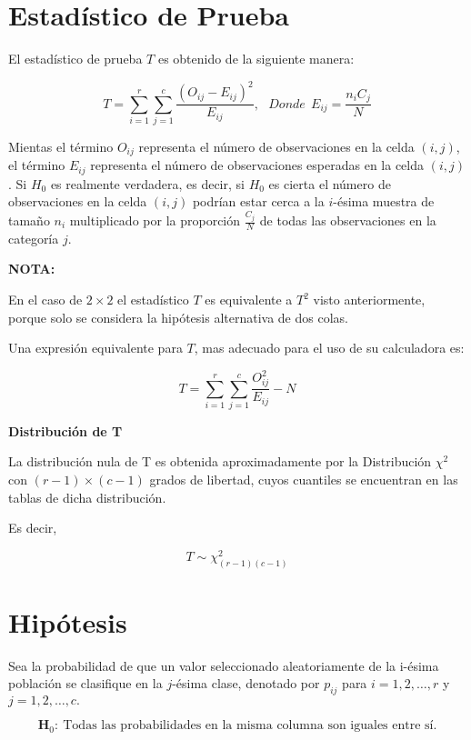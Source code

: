 \documentclass[
  a4paper,
  oneside,
  openany]{book}
\begin{document}
\hypertarget{estaduxedstico-de-prueba-11}{%
\section{Estadístico de Prueba}\label{estaduxedstico-de-prueba-11}}

El estadístico de prueba \(T\) es obtenido de la siguiente manera:

\[T=\sum_{i=1}^{r}\sum_{j=1}^{c}\frac{(O_{ij}-E_{ij})^2}{E_{ij}}, \ \ \ Donde\ \ E_{ij}=\frac{n_{i}C_{j}}{N}\]

Mientas el término \(O_{ij}\) representa el número de observaciones en la celda \((i,j)\), el término \(E_{ij}\) representa el número de observaciones esperadas en la celda \((i,j)\). Si \(H_0\) es realmente verdadera, es decir, si \(H_0\) es cierta el número de observaciones en la celda \((i,j)\) podrían estar cerca a la \(i\)-ésima muestra de tamaño \(n_{i}\) multiplicado por la proporción \(\frac{C_{j}}{N}\) de todas las observaciones en la categoría \(j\).

\textbf{NOTA:}

En el caso de \(2 \times 2\) el estadístico \(T\) es equivalente a \(T^2\) visto anteriormente, porque solo se considera la hipótesis alternativa de dos colas.

Una expresión equivalente para \(T\), mas adecuado para el uso de su calculadora es:

\[T=\sum_{i=1}^{r}\sum_{j=1}^{c}\frac{O_{ij}^{2}}{E_{ij}}-N\]

\textbf{Distribución de T}

La distribución nula de T es obtenida aproximadamente por la Distribución \(\chi^2\) con \((r-1)\times(c-1)\) grados de libertad, cuyos cuantiles se encuentran en las tablas de dicha distribución.

Es decir,

\[T\sim \chi^2_{(r-1)(c-1)}\]

\hypertarget{hipuxf3tesis-11}{%
\section{Hipótesis}\label{hipuxf3tesis-11}}

Sea la probabilidad de que un valor seleccionado aleatoriamente de la i-ésima población se clasifique en la \(j\)-ésima clase, denotado por \(p_{ij}\) para \(i= 1, 2,\ldots,r\) y \(j=1,2,\ldots,c.\)

\[\textbf{H}_0: \ \mbox{Todas las probabilidades en la misma columna son iguales entre sí.}\]
\end{document}
